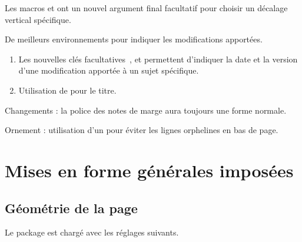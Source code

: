 \begin{center}
\small
\begin{minipage}{.9\textwidth}
\begin{tdocnote}
\begin{tdocnew}
	\item Les macros  et  ont un nouvel argument final facultatif  pour choisir un décalage vertical spécifique.

	\item De meilleurs environnements pour indiquer les modifications apportées.
	\begin{enumerate}
		\item Les nouvelles clés facultatives \,,  et  permettent d'indiquer la date et la version d'une modification apportée à un sujet spécifique.

		\item Utilisation de  pour le titre.
	\end{enumerate}
\end{tdocnew}


\begin{tdocupdate}
	\item Changements : la police des notes de marge aura toujours une forme normale.

	\item Ornement : utilisation d'un \tdocinlatex{\cleaders} pour éviter les lignes orphelines en bas de page.
\end{tdocupdate}
\end{tdocnote}
\end{minipage}
\end{center}


\newpage
\tableofcontents
\newpage


\section{Mises en forme générales imposées}

\subsection{Géométrie de la page}

Le package  est chargé avec les réglages suivants.


\begin{tdoclatex}[code]
\RequirePackage[
  top            = 2.5cm,
  bottom         = 2.5cm,
  left           = 2.5cm,
  right          = 2.5cm,
  marginparwidth = 2cm,
  marginparsep   = 2mm,
  heightrounded
]{geometry}
\end{tdoclatex}


